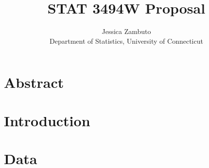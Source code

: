 \documentclass[12pt]{article}
\title{STAT 3494W Proposal}
\author{Jessica Zambuto\\
Department of Statistics, University of Connecticut}
\begin{document}
\maketitle
\section*{Abstract}
\label{sec:Abstract}
\section{Introduction}
\label{sec:Introduction}
\section{Data}
\label{sec:Methods}
\end{document}
